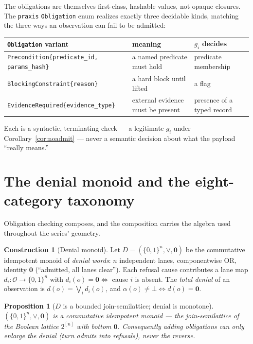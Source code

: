 \documentclass[11pt,oneside]{book}
\theoremstyle{definition}
\newtheorem{construction}{Construction}[chapter]
\theoremstyle{plain}
\newtheorem{proposition}[theorem]{Proposition}
\theoremstyle{remark}
\newcommand{\Obs}{\mathcal{O}}                 %
\newcommand{\adm}{\alpha}                      %
\newcommand{\Rfsl}{\bot}                        %
\newcommand{\code}[1]{\texttt{#1}}
\begin{document}
The obligations are themselves first-class, hashable values, not opaque closures. The
\code{praxis} \code{Obligation} enum realizes exactly three decidable kinds, matching the
three ways an observation can fail to be admitted:
\begin{center}
\begin{tabular}{lll}
\toprule
\code{Obligation} variant & meaning & $g_i$ decides \\
\midrule
\code{Precondition\{predicate\_id, params\_hash\}} & a named predicate must hold & predicate membership \\
\code{BlockingConstraint\{reason\}} & a hard block until lifted & a flag \\
\code{EvidenceRequired\{evidence\_type\}} & external evidence must be present & presence of a typed record \\
\bottomrule
\end{tabular}
\end{center}
Each is a syntactic, terminating check --- a legitimate $g_i$ under
Corollary~\ref{cor:noadmit} --- never a semantic decision about what the payload
``really means.''

\section{The denial monoid and the eight-category taxonomy}

Obligation checking composes, and the composition carries the algebra used throughout the
series' geometry.

\begin{construction}[Denial monoid]\label{con:denial}
Let $D=(\{0,1\}^{n},\lor,\bm 0)$ be the commutative idempotent monoid of \emph{denial
words}: $n$ independent lanes, componentwise OR, identity $\bm 0$ (``admitted, all lanes
clear''). Each refusal cause contributes a lane map $d_i:\Obs\to\{0,1\}^{n}$ with
$d_i(o)=\bm0\iff$ cause $i$ is absent. The \emph{total denial} of an observation is
$d(o)=\bigvee_{i} d_i(o)$, and $\adm(o)\neq\Rfsl\iff d(o)=\bm0$.
\end{construction}

\begin{proposition}[$D$ is a bounded join-semilattice; denial is monotone]\label{prop:semilattice}
$(\{0,1\}^{n},\lor,\bm0)$ is a commutative idempotent monoid --- the join-semilattice of
the Boolean lattice $2^{[n]}$ with bottom $\bm0$. Consequently adding obligations can only
enlarge the denial (turn admits into refusals), never the reverse.
\end{proposition}
\end{document}
